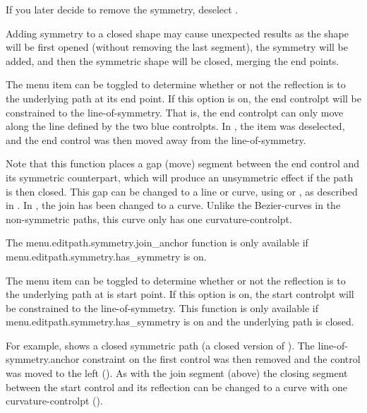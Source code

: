 If you later decide to remove the symmetry, deselect
.

\begin{warning}
Adding \gls{symmetry} to a closed shape may cause unexpected
results as the shape will be first opened (without removing the
last segment), the \gls{symmetry} will be added, and then the symmetric
shape will be closed, merging the end points.
\end{warning}


The  menu item can be toggled to
determine whether or not the reflection is
 to the underlying
path at its end point. If this option is on, the end \gls{controlpt}
will be constrained to the \gls{line-of-symmetry}.  That is, the end
\gls{controlpt} can only move along the line defined by the two blue
\glspl*{controlpt}.  In , the
 item was deselected, and the
end control was then moved away from the \gls{line-of-symmetry}.

Note that this function places a \gls{gap} (move) segment between the
end control and its symmetric counterpart, which will produce an
unsymmetric effect if the path is then closed. This gap can be changed to
a line or curve, using  or
, as described in
. In ,
the join has been changed to a curve. Unlike the \glspl{Bezier-curve}
in the non-symmetric paths, this curve only has one 
\gls{curvature-controlpt}.

The \gls{menu.editpath.symmetry.join_anchor} function is only available
if \gls{menu.editpath.symmetry.has_symmetry} is on.


The  menu item can be toggled
to determine whether or not the reflection is
 to the
underlying path at is start point.  If this option is on, the start
\gls{controlpt} will be constrained to the \gls{line-of-symmetry}.  This
function is only available if
\gls{menu.editpath.symmetry.has_symmetry} is on and the
underlying \gls{path} is closed.

For example,  shows a closed
symmetric path (a closed version of ). The
\gls{line-of-symmetry.anchor} constraint on the first control was
then removed and the control was moved to the left
(). As with the join segment (above)
the closing segment between the start control and its reflection can
be changed to a curve with one \gls{curvature-controlpt}
().

